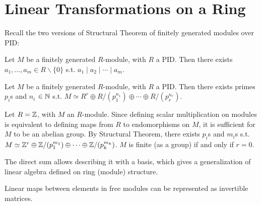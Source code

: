 \documentclass{article}
\begin{document}

\tableofcontents
\newpage

\section{Linear Transformations on a Ring}

Recall the two versions of Structural Theorem of finitely generated modules over PID:

\begin{theorem}[Sturcture, v1]\label{thm:Structure f.g. modules over PID v1}
    Let $M$ be a finitely generated $R$-module, with $R$ a PID. Then there exists $a_1, \ldots, a_m \in R\smallsetminus\{0\}$ s.t. $a_1 \mid a_2 \mid \cdots \mid a_m$. 
\end{theorem}

\begin{theorem}[Structure, v2]\label{thm:Structure f.g. modules over PID v2}
    Let $M$ be a finitely generated $R$-module, with $R$ a PID. Then there exists primes $p_i$s and $n_i$ $\in \mathbb{N}$ s.t. $M \simeq R^r \oplus R/(p_1^{n_1}) \oplus \cdots \oplus R/(p_r^{n_r})$.
\end{theorem}

\begin{example}
    Let $R = \mathbb{Z}$, with $M$ an $R$-module. Since defining scalar multiplication on modules is equivalent to defining maps from $R$ to endomorphisms on $M$, it is sufficient for $M$ to be an abelian group. By Structural Theorem, there exists $p_i$s and $m_i$s s.t. $M \simeq \mathbb{Z}^r \oplus \mathbb{Z}/(p_1^{m_1}) \oplus \cdots \oplus \mathbb{Z}/(p_k^{m_k})$. $M$ is finite (as a group) if and only if $r = 0$.    
\end{example}

The direct sum allows describing it with a basis, which gives a generalization of linear algebra defined on ring (module) structure. 

\begin{parenthesis}
    Linear maps between elements in free modules can be represented as invertible matrices. 
\end{parenthesis}
\end{document}
